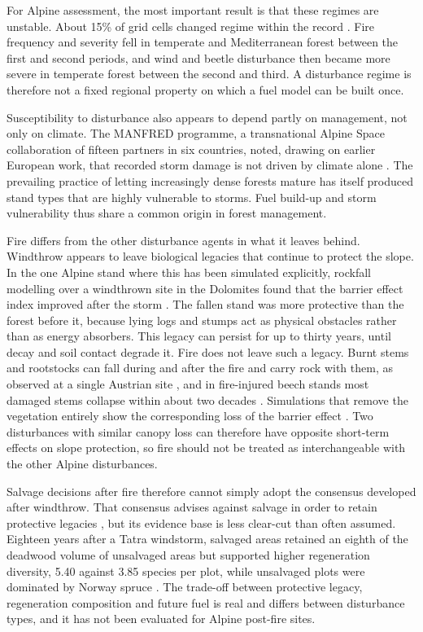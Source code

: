\documentclass[11pt,a4paper]{article}
\begin{document}
For Alpine assessment, the most important result is that these regimes are unstable. About 15\% of grid cells changed regime within the record \citep{miguel_unravelling_2026}. Fire frequency and severity fell in temperate and Mediterranean forest between the first and second periods, and wind and beetle disturbance then became more severe in temperate forest between the second and third. A disturbance regime is therefore not a fixed regional property on which a fuel model can be built once.

Susceptibility to disturbance also appears to depend partly on management, not only on climate. The MANFRED programme, a transnational Alpine Space collaboration of fifteen partners in six countries, noted, drawing on earlier European work, that recorded storm damage is not driven by climate alone \citep{jandl_management_2013}. The prevailing practice of letting increasingly dense forests mature has itself produced stand types that are highly vulnerable to storms. Fuel build-up and storm vulnerability thus share a common origin in forest management.

Fire differs from the other disturbance agents in what it leaves behind. Windthrow appears to leave biological legacies that continue to protect the slope. In the one Alpine stand where this has been simulated explicitly, rockfall modelling over a windthrown site in the Dolomites found that the barrier effect index improved after the storm \citep{costa_biological_2021}. The fallen stand was more protective than the forest before it, because lying logs and stumps act as physical obstacles rather than as energy absorbers. This legacy can persist for up to thirty years, until decay and soil contact degrade it. Fire does not leave such a legacy. Burnt stems and rootstocks can fall during and after the fire and carry rock with them, as observed at a single Austrian site \citep{melzner_brief_2019}, and in fire-injured beech stands most damaged stems collapse within about two decades \citep{maringer_temporal_2016}. Simulations that remove the vegetation entirely show the corresponding loss of the barrier effect \citep{asteriou_assessing_2025}. Two disturbances with similar canopy loss can therefore have opposite short-term effects on slope protection, so fire should not be treated as interchangeable with the other Alpine disturbances.

Salvage decisions after fire therefore cannot simply adopt the consensus developed after windthrow. That consensus advises against salvage in order to retain protective legacies \citep{costa_biological_2021}, but its evidence base is less clear-cut than often assumed. Eighteen years after a Tatra windstorm, salvaged areas retained an eighth of the deadwood volume of unsalvaged areas but supported higher regeneration diversity, 5.40 against 3.85 species per plot, while unsalvaged plots were dominated by Norway spruce \citep{seben_impact_2024}. The trade-off between protective legacy, regeneration composition and future fuel is real and differs between disturbance types, and it has not been evaluated for Alpine post-fire sites.
\end{document}
